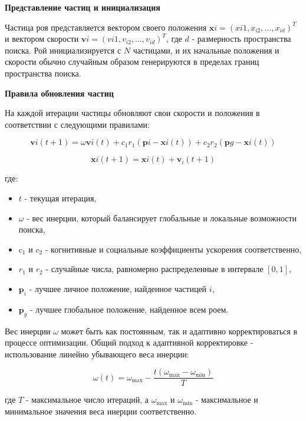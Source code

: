\textbf{Представление частиц и инициализация}

Частица роя представляется вектором своего положения
$\mathbf{x}i = (x{i1}, x_{i2}, \dots, x_{id})^T$ и вектором скорости
$\mathbf{v}i = (v{i1}, v_{i2}, \dots, v_{id})^T$,
где $d$ - размерность пространства поиска.
Рой инициализируется с $N$ частицами, и их начальные положения
и скорости обычно случайным образом генерируются в пределах
границ пространства поиска.

\textbf{Правила обновления частиц}

На каждой итерации частицы обновляют свои скорости и положения в
соответствии с следующими правилами:

\begin{equation*}
\mathbf{v}{i}(t+1) = \omega \mathbf{v}{i}(t)
+ c_1 r_1 (\mathbf{p}{i} - \mathbf{x}{i}(t))
+ c_2 r_2 (\mathbf{p}{g} - \mathbf{x}{i}(t))
\end{equation*}

\begin{equation*}
\mathbf{x}{i}(t+1) = \mathbf{x}{i}(t) + \mathbf{v}_{i}(t+1)
\end{equation*}

где:
\begin{itemize}
\item $t$ - текущая итерация,
\item $\omega$ - вес инерции, который балансирует глобальные и локальные возможности поиска,
\item $c_1$ и $c_2$ - когнитивные и социальные коэффициенты ускорения соответственно,
\item $r_1$ и $r_2$ - случайные числа, равномерно распределенные в интервале $[0, 1]$,
\item $\mathbf{p}_i$ - лучшее личное положение, найденное частицей $i$,
\item $\mathbf{p}_g$ - лучшее глобальное положение, найденное всем роем.
\end{itemize}

Вес инерции $\omega$ может быть как постоянным, так и
адаптивно корректироваться в процессе оптимизации.
Общий подход к адаптивной корректировке - использование
линейно убывающего веса инерции:

\begin{equation*}
\omega(t) = \omega_{\max} - \frac{t(\omega_{\max}
    - \omega_{\min})}{T}
\end{equation*}

где $T$ - максимальное число итераций, а $\omega_{\max}$
и $\omega_{\min}$ - максимальное и
минимальное значения веса инерции соответственно.

